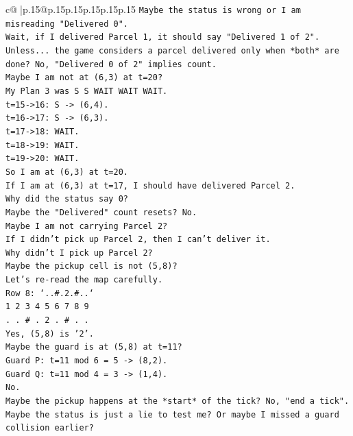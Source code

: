 \documentclass{article}
\begin{document}
{\begin{supertabular}{c@{$\;$}|p{.15\linewidth}@{}p{.15\linewidth}p{.15\linewidth}p{.15\linewidth}p{.15\linewidth}p{.15\linewidth}}
{{{\texttt{Maybe the status is wrong or I am misreading "Delivered 0".} \\
\texttt{Wait, if I delivered Parcel 1, it should say "Delivered 1 of 2".} \\
\texttt{Unless... the game considers a parcel delivered only when *both* are done? No, "Delivered 0 of 2" implies count.} \\
\texttt{Maybe I am not at (6,3) at t=20?} \\
\texttt{My Plan 3 was S S WAIT WAIT WAIT.} \\
\texttt{t=15{-}>16: S {-}> (6,4).} \\
\texttt{t=16{-}>17: S {-}> (6,3).} \\
\texttt{t=17{-}>18: WAIT.} \\
\texttt{t=18{-}>19: WAIT.} \\
\texttt{t=19{-}>20: WAIT.} \\
\texttt{So I am at (6,3) at t=20.} \\
\texttt{If I am at (6,3) at t=17, I should have delivered Parcel 2.} \\
\texttt{Why did the status say 0?} \\
\texttt{Maybe the "Delivered" count resets? No.} \\
\texttt{Maybe I am not carrying Parcel 2?} \\
\texttt{If I didn't pick up Parcel 2, then I can't deliver it.} \\
\texttt{Why didn't I pick up Parcel 2?} \\
\texttt{Maybe the pickup cell is not (5,8)?} \\
\texttt{Let's re{-}read the map carefully.} \\
\texttt{Row 8: `..\#.2.\#..`} \\
\texttt{1 2 3 4 5 6 7 8 9} \\
\texttt{. . \# . 2 . \# . .} \\
\texttt{Yes, (5,8) is '2'.} \\
\texttt{Maybe the guard is at (5,8) at t=11?} \\
\texttt{Guard P: t=11 mod 6 = 5 {-}> (8,2).} \\
\texttt{Guard Q: t=11 mod 4 = 3 {-}> (1,4).} \\
\texttt{No.} \\
\texttt{Maybe the pickup happens at the *start* of the tick? No, "end a tick".} \\
\texttt{Maybe the status is just a lie to test me? Or maybe I missed a guard collision earlier?} \\
}}}
\end{supertabular}}
\end{document}
